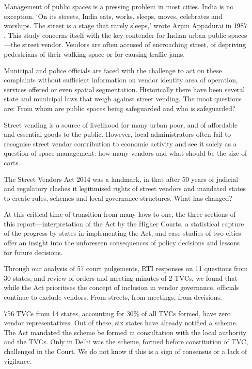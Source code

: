 \documentclass[a4paper, 12pt, twoside]{article}
\begin{document}
{{Management of public spaces is a pressing problem in most cities. India is no exception. `On its streets, India eats, works, sleeps, moves, celebrates and worships. The street is a stage that rarely sleeps,' wrote Arjun Appadurai in 1987 \parencite{naikpaper}. This study concerns itself with the key contender for Indian urban public spaces—the street vendor. Vendors are often accused of encroaching street, of depriving pedestrians of their walking space or for causing traffic jams. 

Municipal and police officials are faced with the challenge to act on these complaints without sufficient information on vendor identity area of operation, services offered or even spatial segmentation. Historically there have been several state and municipal laws that weigh against street vending. The moot questions are: From whom are public spaces being safeguarded and who is safeguarded? 

Street vending is a source of livelihood for many urban poor, and of affordable and essential goods to the public. However, local administrators often fail to recognise street vendor contribution to economic activity and see it solely as a question of space management: how many vendors and what should be the size of carts. 

The Street Vendors Act 2014 was a landmark, in that after 50 years of judicial and regulatory clashes it legitimised rights of street vendors and mandated states to create rules, schemes and local governance structures. What has changed? 

At this critical time of transition from many laws to one, the three sections of this report—interpretation of the Act by the Higher Courts, a statistical capture of the progress by states in implementing the Act, and case studies of two cities—offer an insight into the unforeseen consequences of policy decisions and lessons for future decisions. 

Through our analysis of 57 court judgements, RTI responses on 11 questions from 30 states, and review of orders and meeting minutes of 2 TVCs, we found that while the Act prioritises the concept of inclusion in vendor governance, officials continue to exclude vendors. From streets, from meetings, from decisions. 

756 TVCs from 14 states, accounting for 30\% of all TVCs formed, have zero vendor representatives. Out of these, six states have already notified a scheme. The Act mandated the scheme be formed in consultation with the local authority and the TVCs. Only in Delhi was the scheme, formed before constitution of TVC, challenged in the Court. We do not know if this is a sign of consensus or a lack of vigilance.

}}
\end{document}
